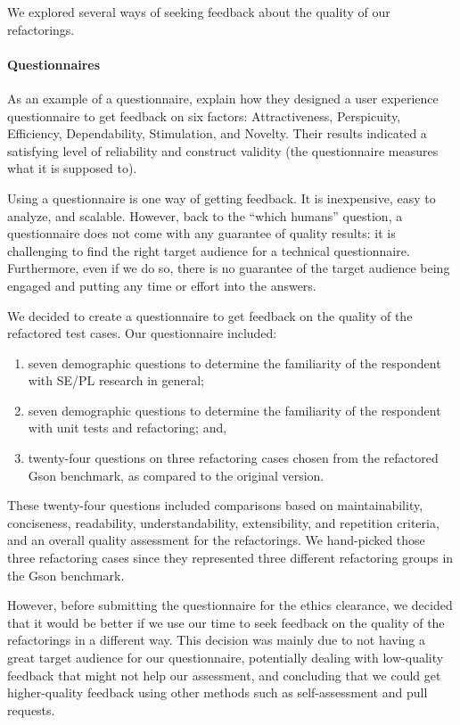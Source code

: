 We explored several ways of seeking feedback about the quality of our
refactorings.

\paragraph{Questionnaires}
As an example of a questionnaire,  explain
how they designed a user experience questionnaire to get feedback on
six factors: Attractiveness, Perspicuity, Efficiency, Dependability,
Stimulation, and Novelty. Their results indicated a satisfying level
of reliability and construct validity (the questionnaire measures what
it is supposed to).


Using a questionnaire is one way of getting feedback. It is
inexpensive, easy to analyze, and scalable. However, back to the
``which humans'' question, a questionnaire does not come with any
guarantee of quality results: it is challenging to find the right
target audience for a technical questionnaire. Furthermore, even if we
do so, there is no guarantee of the target audience being
engaged and putting any time or effort into the answers.

We decided to create a questionnaire to get feedback on the quality of the refactored test cases. Our questionnaire included:

\begin{enumerate}
  \item seven demographic questions to determine the familiarity of the respondent with SE/PL research in general;
  \item seven demographic questions to determine the familiarity of the respondent with unit tests and refactoring; and,
  \item twenty-four questions on three refactoring cases chosen from the refactored Gson benchmark, as compared to the original version.
\end{enumerate}

These twenty-four questions included comparisons based on maintainability, conciseness, readability, understandability, extensibility, and repetition criteria, and an overall quality assessment for the refactorings.
We hand-picked those three refactoring cases since they represented three different refactoring groups in the Gson benchmark.

However, before submitting the questionnaire for the ethics clearance, we decided that it would be better if we use our time to seek feedback on the quality of the refactorings in a different way. This decision was mainly due to not having a great target audience for our questionnaire, potentially dealing with low-quality feedback that might not help our assessment, and concluding that we could get higher-quality feedback using other methods such as self-assessment and pull requests.

